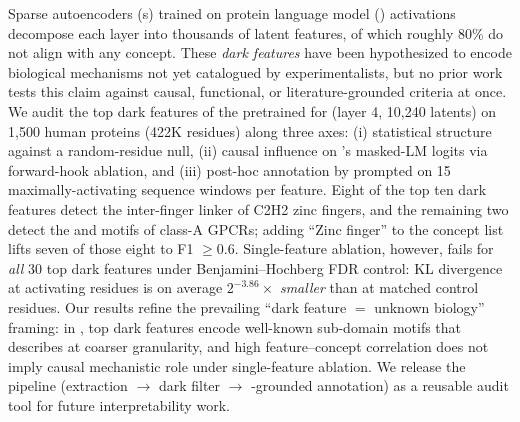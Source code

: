 Sparse autoencoders (\sae{}s) trained on protein language model (\plm) activations decompose each layer into thousands of latent features, of which roughly 80\% do not align with any \swissprot concept. These \emph{dark features} have been hypothesized to encode biological mechanisms not yet catalogued by experimentalists, but no prior work tests this claim against causal, functional, or literature-grounded criteria at once. We audit the top dark features of the pretrained \interplm \sae for \esm (layer 4, 10{,}240 latents) on 1{,}500 human \swissprot proteins (422K residues) along three axes: (i) statistical structure against a random-residue null, (ii) causal influence on \esm's masked-LM logits via forward-hook ablation, and (iii) post-hoc annotation by \gptfive prompted on 15 maximally-activating sequence windows per feature. Eight of the top ten dark features detect the \tgekp inter-finger linker of C2H2 zinc fingers, and the remaining two detect the \dry and \npxxy motifs of class-A GPCRs; adding ``Zinc finger'' to the concept list lifts seven of those eight to F1 $\geq 0.6$. Single-feature ablation, however, fails for \emph{all} 30 top dark features under Benjamini--Hochberg FDR control: KL divergence at activating residues is on average $2^{-3.86}\times$ \emph{smaller} than at matched control residues. Our results refine the prevailing ``dark feature $=$ unknown biology'' framing: in \esm, top dark features encode well-known sub-domain motifs that \swissprot describes at coarser granularity, and high feature--concept correlation does not imply causal mechanistic role under single-feature ablation. We release the pipeline (\sae extraction $\rightarrow$ dark filter $\rightarrow$ \plm-grounded annotation) as a reusable audit tool for future \plm interpretability work.

